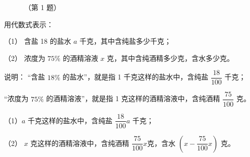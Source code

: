\begin{enhancedline}
\begin{xiaoxiaotis}


\end{xiaoxiaotis}


\lianxi
\begin{xiaotis}


\begin{figure}[htbp]
    \centering
    
    \caption*{（第 1 题）}
\end{figure}

\begin{xiaoxiaotis}



\end{xiaoxiaotis}


\end{xiaotis}
\lianxijiange


\liti 用代数式表示：

（1） 含盐 18 的盐水 $a$ 千克，其中含纯盐多少千克；

（2） 浓度为 $75\%$ 的酒精溶液 $x$ 克，其中含纯酒精多少克，含水多少克。

说明： “含盐 $18\%$ 的盐水”，就是指 1 千克这样的盐水中，含纯盐 $\dfrac{18}{100}$ 千克；

“浓度为 $75\%$ 的酒精溶液”，就是指 1 克这样的酒精溶液中，含纯酒精 $\dfrac{75}{100}$ 克。

\jie （1）$a$ 千克这样的盐水中，含纯盐 $\dfrac{18}{100}a$ 千克；

（2） $x$ 克这样的酒精溶液中，含纯酒精 $\dfrac{75}{100}x$克，含水 $\left(x - \dfrac{75}{100}x\right)$ 克。


\lianxi
\begin{xiaotis}

\begin{xiaoxiaotis}



\end{xiaoxiaotis}



\end{xiaotis}
\end{enhancedline}
